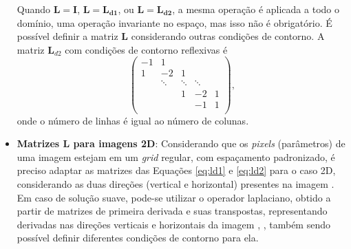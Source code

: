 \begin{itemize}
Quando $\mathbf{L} = \mathbf{I}$, $\mathbf{L} = \mathbf{L_{d1}}$, ou $\mathbf{L} = \mathbf{L_{d2}}$, a mesma operação é aplicada a todo o domínio, uma operação invariante no espaço, mas isso não é obrigatório. É possível definir a matriz $\mathbf{L}$ considerando outras condições de contorno. A matriz $\mathbf{L}_{d2}$ com condições de contorno reflexivas \cite[págs. 175-6]{hansen2010discrete} é
\begin{equation}
 \begin{pmatrix}
- 1 & 1 & & &\\
1 & -2 & 1 & & \\
& \ddots & \ddots & \ddots & \\
& & 1 & -2 & 1 \\
& &  & -1 & 1 \\
\end{pmatrix},
\label{eq:ld2r}
\end{equation}
onde o número de linhas é igual ao número de colunas. 

\item \textbf{Matrizes $\mathbf{L}$ para imagens 2D}:  Considerando que os \textit{pixels} (parâmetros) de uma imagem estejam em um \textit{grid} regular, com espaçamento padronizado, é preciso adaptar as matrizes das Equações \eqref{eq:ld1} e \eqref{eq:ld2} para o caso 2D, considerando  as duas direções (vertical e horizontal) presentes na imagem \cite[pág. 92-5]{hansen2006deblurring}. Em caso de solução suave, pode-se utilizar o operador laplaciano, obtido a partir de matrizes de primeira derivada e suas transpostas, representando derivadas nas direções verticais e horizontais da imagem \cite[pág. 177]{hansen2010discrete}, \cite[pág. 82-3]{kaipio2005statistical}, também sendo possível definir diferentes condições de contorno para ela.
\end{itemize}

